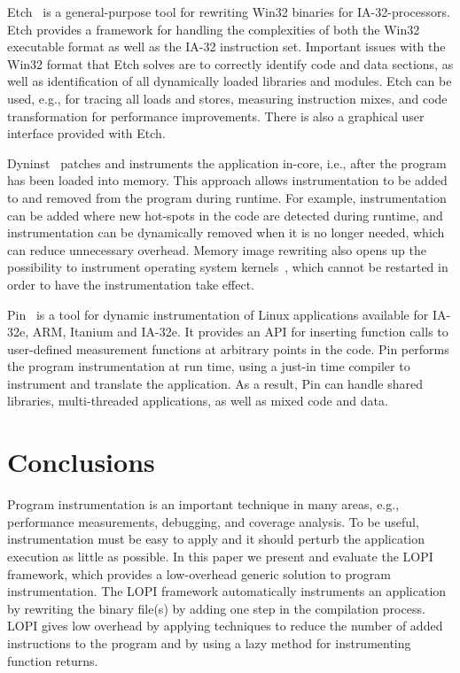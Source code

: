 Etch~\cite{etch} is a general-purpose tool for rewriting Win32 binaries for
IA-32-processors. Etch provides a framework for handling the complexities of
both the Win32 executable format as well as the IA-32 instruction set. Important
issues with the Win32 format that Etch solves are to correctly identify code
and data sections, as well as identification of all dynamically loaded
libraries and modules. Etch can be used, e.g., for tracing all loads and
stores, measuring instruction mixes, and code transformation for performance
improvements.  There is also a graphical user interface provided with Etch.

Dyninst~\cite{buck00dyninst, paradyn95} patches and instruments the application
in-core, i.e., after the program has been loaded into memory.  This approach
allows instrumentation to be added to and removed from the program during
runtime. For example, instrumentation can be added where new hot-spots in the
code are detected during runtime, and instrumentation can be dynamically
removed when it is no longer needed, which can reduce unnecessary overhead.
Memory image rewriting also opens up the possibility to instrument operating
system kernels~\cite{tamches1999kerninst}, which cannot be restarted in order
to have the instrumentation take effect.

Pin~\cite{luk05pin,Pinpoint} is a tool for dynamic instrumentation of Linux
applications available for IA-32e, ARM, Itanium and IA-32e. It provides an API
for inserting function calls to user-defined measurement functions at
arbitrary points in the code. Pin performs the program instrumentation at run
time, using a just-in time compiler to instrument and translate the
application.  As a result, Pin can handle shared libraries, multi-threaded
applications, as well as mixed code and data.

\section{Conclusions}
\label{sec:lopi:conclusion}

Program instrumentation is an important technique in many areas, e.g.,
performance measurements, debugging, and coverage analysis.  To be useful,
instrumentation must be easy to apply and it should perturb the application
execution as little as possible. In this paper we present and evaluate the
LOPI framework, which provides a low-overhead generic solution to program
instrumentation.  The LOPI framework automatically instruments an application
by rewriting the binary file(s) by adding one step in the compilation process.
LOPI gives low overhead by applying techniques to reduce the number of added
instructions to the program and by using a lazy method for instrumenting
function returns.

